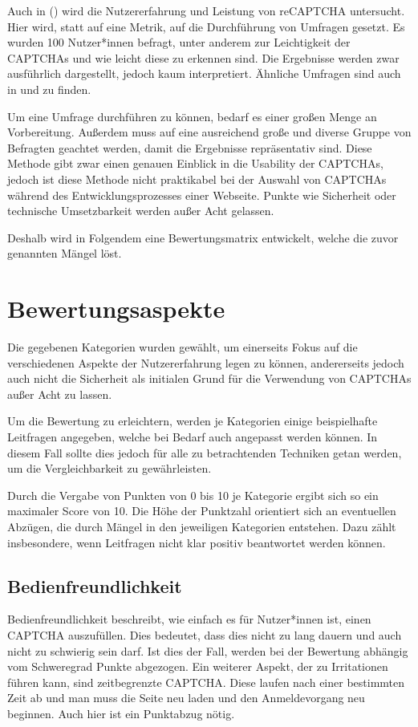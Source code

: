 Auch in  (\cite{Beheshti}) wird die Nutzererfahrung und Leistung von reCAPTCHA untersucht.
Hier wird, statt auf eine Metrik, auf die Durchführung von Umfragen gesetzt.
Es wurden 100 Nutzer*innen befragt, unter anderem zur Leichtigkeit der CAPTCHAs und wie leicht diese zu erkennen sind.
Die Ergebnisse werden zwar ausführlich dargestellt, jedoch kaum interpretiert.
\cite{Beheshti}
Ähnliche Umfragen sind auch in \cite{madathil2010investigation} und \cite{wismer} zu finden.

Um eine Umfrage durchführen zu können, bedarf es einer großen Menge an Vorbereitung.
Außerdem muss auf eine ausreichend große und diverse Gruppe von Befragten geachtet werden, damit die Ergebnisse repräsentativ sind.
Diese Methode gibt zwar einen genauen Einblick in die Usability der CAPTCHAs, 
jedoch ist diese Methode nicht praktikabel bei der Auswahl von CAPTCHAs während des Entwicklungsprozesses einer Webseite.
Punkte wie Sicherheit oder technische Umsetzbarkeit werden außer Acht gelassen.

Deshalb wird in Folgendem eine Bewertungsmatrix entwickelt, welche die zuvor genannten Mängel löst.

\section{Bewertungsaspekte}
\label{ch:matrix:aspekte}
Die gegebenen Kategorien wurden gewählt, um einerseits Fokus auf die verschiedenen Aspekte der Nutzererfahrung legen zu können,
andererseits jedoch auch nicht die Sicherheit als initialen Grund für die Verwendung von CAPTCHAs außer Acht zu lassen.

Um die Bewertung zu erleichtern, werden je Kategorien einige beispielhafte Leitfragen angegeben, welche bei Bedarf auch angepasst werden können.
In diesem Fall sollte dies jedoch für alle zu betrachtenden Techniken getan werden, um die Vergleichbarkeit zu gewährleisten.

Durch die Vergabe von Punkten von 0 bis 10 je Kategorie ergibt sich so ein maximaler Score von 10.
Die Höhe der Punktzahl orientiert sich an eventuellen Abzügen, die durch Mängel in den jeweiligen Kategorien entstehen.
Dazu zählt insbesondere, wenn Leitfragen nicht klar positiv beantwortet werden können.

\subsection{Bedienfreundlichkeit}
\label{ch:matrix:aspekte:Bedienfreundlichkeit}
Bedienfreundlichkeit beschreibt, wie einfach es für Nutzer*innen ist, einen CAPTCHA auszufüllen.
Dies bedeutet, dass dies nicht zu lang dauern und auch nicht zu schwierig sein darf. 
Ist dies der Fall, werden bei der Bewertung abhängig vom Schweregrad Punkte abgezogen. %
Ein weiterer Aspekt, der zu Irritationen führen kann, sind zeitbegrenzte CAPTCHA. 
Diese laufen nach einer bestimmten Zeit ab und man muss die Seite neu laden und den Anmeldevorgang neu beginnen.
Auch hier ist ein Punktabzug nötig.

